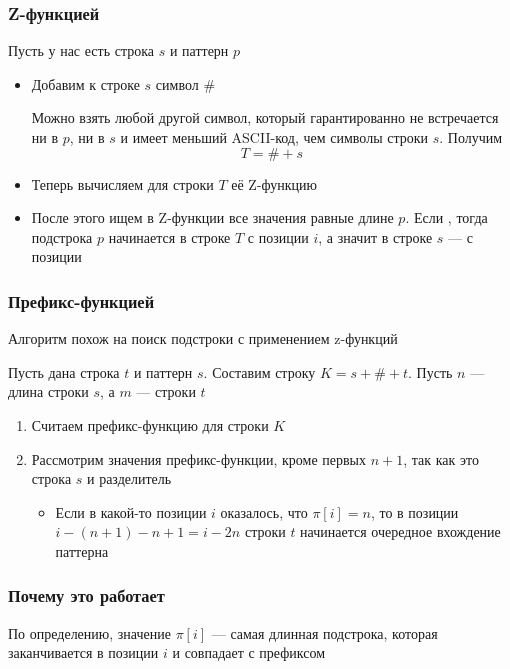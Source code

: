 \documentclass[a4paper]{article}
\begin{document}
\subsubsection{Z-функцией}
Пусть у нас есть строка $s$ и паттерн $p$
\begin{itemize}
    \item Добавим к строке $s$ символ \#
    
    Можно взять любой другой символ, который гарантированно не встречается ни в $p$, ни в $s$ и имеет меньший ASCII-код, чем символы строки $s$. Получим
    $$T=\#+s$$
    \item Теперь вычисляем для строки $T$ её Z-функцию
    \item После этого ищем в Z-функции все значения равные длине $p$. Если , тогда подстрока $p$ начинается в строке $T$ с позиции $i$, а значит в строке $s$ — с позиции 
\end{itemize}


\subsubsection{Префикс-функцией}
Алгоритм похож на поиск подстроки с применением z-функций

Пусть дана строка $t$ и паттерн $s$. Составим строку $K=s+\#+t$. Пусть $n$ — длина строки $s$, а $m$ — строки $t$
\begin{enumerate}
    \item Считаем префикс-функцию для строки $K$
    \item Рассмотрим значения префикс-функции, кроме первых $n+1$, так как это строка $s$ и разделитель
    \begin{itemize}
        \item Если в какой-то позиции $i$ оказалось, что $\pi[i]=n$, то в позиции $i-(n+1)-n+1=i-2n$ строки $t$ начинается очередное вхождение паттерна
    \end{itemize}
\end{enumerate}

\subsubsection*{Почему это работает}
По определению, значение $\pi[i]$ — самая длинная подстрока, которая заканчивается в позиции $i$ и совпадает с префиксом
\end{document}
